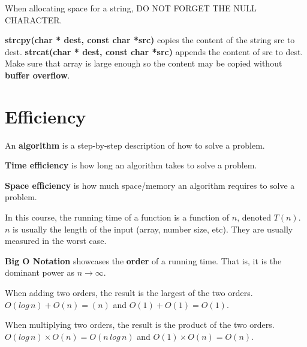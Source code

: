 \documentclass[english, 12pt]{article}
\begin{document}
\begin{qte}
When allocating space for a string, DO NOT FORGET THE NULL CHARACTER.
\end{qte}

\begin{defn}
\textbf{strcpy(char * dest, const char *src)} copies the content of the string src to dest. \textbf{strcat(char * dest, const char *src)} appends the content of src to dest. Make sure that array is large enough so the content may be copied without \textbf{buffer overflow}.
\end{defn}

\section{Efficiency}

\begin{defn}
An \textbf{algorithm} is a step-by-step description of how to solve a problem.
\end{defn}

\begin{defn}
\textbf{Time efficiency} is how long an algorithm takes to solve a problem.
\end{defn}

\begin{defn}
\textbf{Space efficiency} is how much space/memory an algorithm requires to solve a problem.
\end{defn}

\begin{defn}
In this course, the running time of a function is a function of $n$, denoted $T(n)$. $n$ is usually the length of the input (array, number size, etc). They are usually measured in the worst case.
\end{defn}

\begin{defn}
\textbf{Big O Notation} showcases the \textbf{order} of a running time. That is, it is the dominant power as $n \to \infty$.
\end{defn}

\begin{exmp}
When adding two orders, the result is the largest of the two orders.\\
$O(log\,n) + O(n) = (n)$ and $O(1) + O(1) = O(1)$.
\end{exmp}

\begin{exmp}
When multiplying two orders, the result is the product of the two orders.\\
$O(log\,n) \times O(n) = O(n\,log\,n)$ and $O(1) \times O(n) = O(n)$.
\end{exmp}
\end{document}
